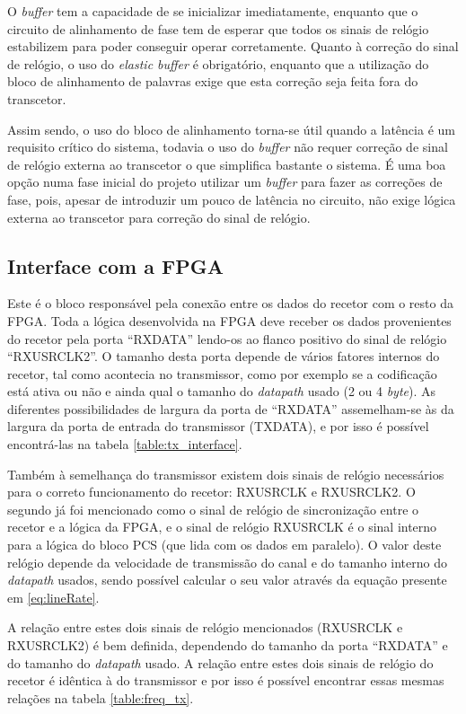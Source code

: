 O \textit{buffer} tem a capacidade de se inicializar imediatamente, enquanto que o circuito de alinhamento de fase tem de esperar que todos os sinais de relógio estabilizem para poder conseguir operar corretamente. Quanto à correção do sinal de relógio, o uso do\textit{ elastic buffer} é obrigatório, enquanto que a utilização do bloco de alinhamento de palavras exige que esta correção seja feita fora do transcetor.

Assim sendo, o uso do bloco de alinhamento torna-se útil quando a latência é um requisito crítico do sistema, todavia o uso do \textit{buffer} não requer correção de sinal de relógio externa ao transcetor o que simplifica bastante o sistema. É uma boa opção numa fase inicial do projeto utilizar um \textit{buffer} para fazer as correções de fase, pois, apesar de introduzir um pouco de latência no circuito, não exige lógica externa ao transcetor para correção do sinal de relógio.

\subsection{Interface com a FPGA}

Este é o bloco responsável pela conexão entre os dados do recetor com o resto da FPGA. Toda a lógica desenvolvida na FPGA deve receber os dados provenientes do recetor pela porta ``RXDATA'' lendo-os ao flanco positivo do sinal de relógio ``RXUSRCLK2''. O tamanho desta porta depende de vários fatores internos do recetor, tal como acontecia no transmissor,  como por exemplo se a codificação está ativa ou não e ainda qual o tamanho do \textit{datapath} usado (2 ou 4 \textit{byte}). As diferentes possibilidades de largura da porta de ``RXDATA'' assemelham-se às da largura da porta de entrada do transmissor (TXDATA), e por isso é possível encontrá-las na tabela \ref{table:tx_interface}.

Também à semelhança do transmissor existem dois sinais de relógio necessários para o correto funcionamento do recetor: RXUSRCLK e RXUSRCLK2. O segundo já foi mencionado como o sinal de relógio de sincronização entre o recetor e a lógica da FPGA, e o sinal de relógio RXUSRCLK é o sinal interno para a lógica do bloco PCS (que lida com os dados em paralelo). O valor deste relógio depende da velocidade de transmissão do canal e do tamanho interno do \textit{datapath} usados, sendo possível calcular o seu valor através da equação presente em \ref{eq:lineRate}.

A relação entre estes dois sinais de relógio mencionados (RXUSRCLK e RXUSRCLK2) é bem definida, dependendo do tamanho da porta ``RXDATA'' e do tamanho do \textit{datapath} usado.  A relação entre estes dois sinais de relógio do recetor é idêntica à do transmissor e por isso é possível encontrar essas mesmas relações na tabela \ref{table:freq_tx}.

